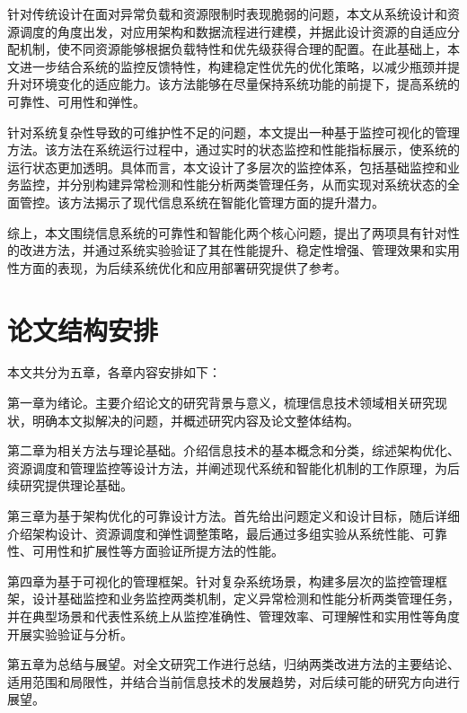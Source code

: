
针对传统设计在面对异常负载和资源限制时表现脆弱的问题，本文从系统设计和资源调度的角度出发，对应用架构和数据流程进行建模，并据此设计资源的自适应分配机制，使不同资源能够根据负载特性和优先级获得合理的配置。在此基础上，本文进一步结合系统的监控反馈特性，构建稳定性优先的优化策略，以减少瓶颈并提升对环境变化的适应能力。该方法能够在尽量保持系统功能的前提下，提高系统的可靠性、可用性和弹性。


针对系统复杂性导致的可维护性不足的问题，本文提出一种基于监控可视化的管理方法。该方法在系统运行过程中，通过实时的状态监控和性能指标展示，使系统的运行状态更加透明。具体而言，本文设计了多层次的监控体系，包括基础监控和业务监控，并分别构建异常检测和性能分析两类管理任务，从而实现对系统状态的全面管控。该方法揭示了现代信息系统在智能化管理方面的提升潜力。

综上，本文围绕信息系统的可靠性和智能化两个核心问题，提出了两项具有针对性的改进方法，并通过系统实验验证了其在性能提升、稳定性增强、管理效果和实用性方面的表现，为后续系统优化和应用部署研究提供了参考。

\section{论文结构安排}\label{ux8bbaux6587ux7ed3ux6784ux5b89ux6392}

本文共分为五章，各章内容安排如下：

第一章为绪论。主要介绍论文的研究背景与意义，梳理信息技术领域相关研究现状，明确本文拟解决的问题，并概述研究内容及论文整体结构。

第二章为相关方法与理论基础。介绍信息技术的基本概念和分类，综述架构优化、资源调度和管理监控等设计方法，并阐述现代系统和智能化机制的工作原理，为后续研究提供理论基础。

第三章为基于架构优化的可靠设计方法。首先给出问题定义和设计目标，随后详细介绍架构设计、资源调度和弹性调整策略，最后通过多组实验从系统性能、可靠性、可用性和扩展性等方面验证所提方法的性能。

第四章为基于可视化的管理框架。针对复杂系统场景，构建多层次的监控管理框架，设计基础监控和业务监控两类机制，定义异常检测和性能分析两类管理任务，并在典型场景和代表性系统上从监控准确性、管理效率、可理解性和实用性等角度开展实验验证与分析。

第五章为总结与展望。对全文研究工作进行总结，归纳两类改进方法的主要结论、适用范围和局限性，并结合当前信息技术的发展趋势，对后续可能的研究方向进行展望。

